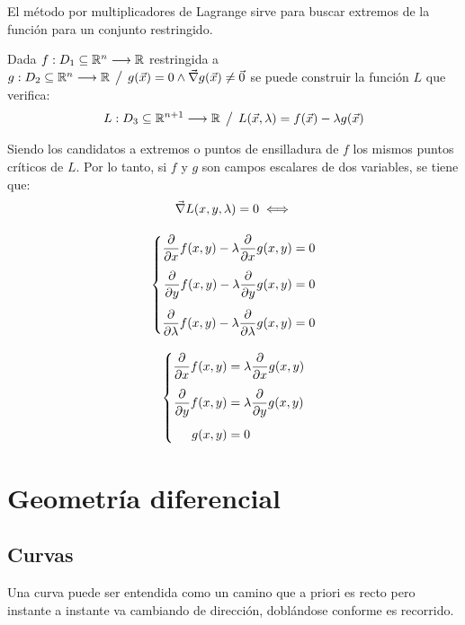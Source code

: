 \documentclass[a5paper,12pt,twoside]{book}
\begin{document}
El método por multiplicadores de Lagrange sirve para buscar extremos de la función para un conjunto restringido.

Dada $f:D_1 \subseteq \mathbb{R}^n \longrightarrow \mathbb{R}$ restringida a $g:D_2 \subseteq \mathbb{R}^n \longrightarrow \mathbb{R} \hspace{1ex} \big/ \hspace{1ex} g(\Vec{x})=0 \land \Vec{\nabla} g(\Vec{x}) \neq \Vec{0}$ se puede construir la función $L$ que verifica:
\begin{equation*}
    L:D_3 \subseteq \mathbb{R}^{n+1} \longrightarrow \mathbb{R} \hspace{1ex} \big/ \hspace{1ex} L(\Vec{x}, \lambda) = f(\Vec{x}) - \lambda g(\Vec{x})
\end{equation*}

Siendo los candidatos a extremos o puntos de ensilladura de $f$ los mismos puntos críticos de $L$. Por lo tanto, si $f$ y $g$ son campos escalares de dos variables, se tiene que:
\begin{gather*}
    \Vec{\nabla} L(x,y,\lambda)=0 \iff
    \\[1em]
    \left\{
    \begin{aligned}
        \frac{\partial}{\partial x} f(x,y) - \lambda \frac{\partial}{\partial x} g(x,y) &= 0
        \\[1ex]
        \frac{\partial}{\partial y} f(x,y) - \lambda \frac{\partial}{\partial y} g(x,y) &= 0
        \\[1ex]
        \frac{\partial}{\partial \lambda} f(x,y) - \lambda \frac{\partial}{\partial \lambda} g(x,y) &= 0
    \end{aligned}
    \right.
    \\[1em]
    \left\{
    \begin{aligned}
        \frac{\partial}{\partial x} f(x,y) &= \lambda \frac{\partial}{\partial x} g(x,y)
        \\[1ex]
        \frac{\partial}{\partial y} f(x,y) &= \lambda \frac{\partial}{\partial y} g(x,y)
        \\[1ex]
        g(x,y) &= 0
    \end{aligned}
    \right.
\end{gather*}


\chapter{Geometría diferencial}


\section{Curvas}


Una curva puede ser entendida como un camino que a priori es recto pero instante a instante va cambiando de dirección, doblándose conforme es recorrido.
\end{document}
